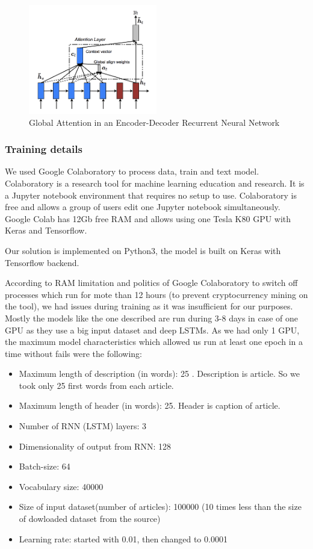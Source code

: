 \begin{figure}[h]
\centering
	\includegraphics[width=0.5\textwidth]{img/seq2seq-with-attention.png}
	\caption{\label{fig:attention}Global Attention in an Encoder-Decoder Recurrent Neural Network}
\end{figure}


\subsubsection{Training details}

We used Google Colaboratory to process data, train and text model. Colaboratory is a research tool for machine learning education and research. It is a Jupyter notebook environment that requires no setup to use. 
Colaboratory is free and allows a group of users edit one Jupyter notebook simultaneously. Google Colab has 12Gb free RAM and allows using one Tesla K80 GPU with Keras and Tensorflow.

Our solution is implemented on Python3, the model is built on Keras with Tensorflow backend. 

According to RAM limitation and politics of Google Colaboratory to switch off processes which run for mote than 12 hours (to prevent cryptocurrency mining on the tool), we had issues during training as it was insufficient for our purposes. Mostly the models like the one described are run during 3-8 days in case of one GPU as they use a big input dataset and deep LSTMs. As we had only 1 GPU, the maximum model characteristics which allowed us run at least one epoch in a time without fails were the following:

\begin{itemize}
\setlength\itemsep{-0.5em}
\item Maximum length of description (in words): 25 . Description is article. So we took only 25 first words from each article. 
\item Maximum length of header (in words): 25. Header is caption of article.
\item Number of RNN (LSTM) layers: 3
\item Dimensionality of output from RNN: 128
\item Batch-size: 64
\item Vocabulary size: 40000
\item Size of input dataset(number of articles): 100000 (10 times less than the size of dowloaded dataset from the source)
\item Learning rate: started with 0.01, then changed to 0.0001
\end{itemize}

